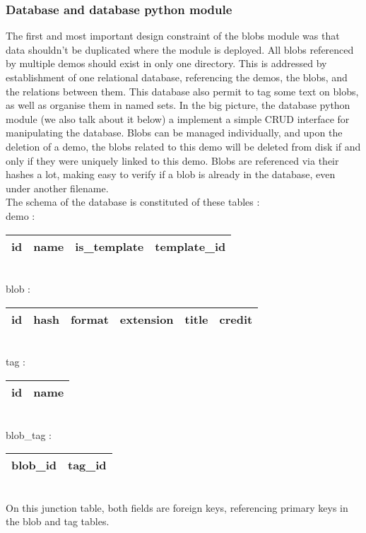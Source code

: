 \subsubsection{Database and database python module}
The first and most important design constraint of the blobs module was that data shouldn't be duplicated where the module is deployed. All blobs referenced by multiple demos should exist in only one directory. This is addressed by establishment of one relational database, referencing the demos, the blobs, and the relations between them. This database also permit to tag some text on blobs, as well as organise them in named sets. In the big picture, the database python module (we also talk about it below) a implement a simple CRUD interface for manipulating the database. Blobs can be managed individually, and upon the deletion of a demo, the blobs related to this demo will be deleted from disk if and only if they were uniquely linked to this demo. Blobs are referenced via their hashes a lot, making easy to verify if a blob is already in the database, even under another filename.\\

The schema of the database is constituted of these tables : \\

demo : 

\begin{tabular}{ | l | l | l | l | }
  \hline
  id & name & is\_template & template\_id \\
  \hline
\end{tabular}\\

blob :

\begin{tabular}{ | l | l | l | l | l | l | }
  \hline
  id & hash & format & extension & title & credit \\
  \hline
\end{tabular}\\

tag :

\begin{tabular}{ | l | l | }
  \hline
  id & name \\
  \hline
\end{tabular}\\

blob\_tag :

\begin{tabular}{ | l | l | }
  \hline
  blob\_id & tag\_id \\
  \hline
\end{tabular}\\
On this junction table, both fields are foreign keys, referencing primary keys in the blob and tag tables.\\

